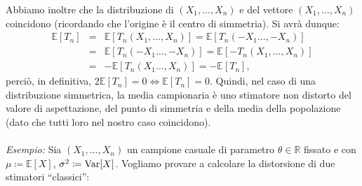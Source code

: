Abbiamo inoltre che la distribuzione di $(X_ 1,\ldots,X_n)$ e del vettore $(X_ 1,\ldots,X_n)$ coincidono (ricordando che l'origine è il centro di simmetria). Si avrà dunque: 
\begin{eqnarray*}
\mathbb{E}[T_n] &=& \mathbb{E}[T_n(X_1,\ldots, X_n)]=\mathbb{E}[T_n(-X_1\ldots ,-X_n)] \\
&=& \mathbb{E}[T_n(-X_1\ldots ,-X_n)]=\mathbb{E}[-T_n(X_1,\ldots, X_n)] \\
&=& -\mathbb{E}[T_n(X_1\ldots ,X_n)]=-\mathbb{E}[T_n],
\end{eqnarray*}
perciò, in definitiva, $2\mathbb{E}[T_n]=0 \Leftrightarrow \mathbb{E}[T_n]=0$. Quindi, nel caso di una distribuzione simmetrica, la media campionaria è uno stimatore non distorto del valore di aspettazione, del punto di simmetria e della media della popolazione (dato che tutti loro nel nostro caso coincidono). \\ \\ \textit{Esempio:} Sia $(X_1,\ldots,X_n)$ un campione casuale di parametro $\theta\in \mathbb{R}$ fissato e con $\mu\coloneqq \mathbb{E}[X]$, $\sigma^2\coloneqq \operatorname{Var}[X]$. Vogliamo provare a calcolare la distorsione di due stimatori ``classici'':
